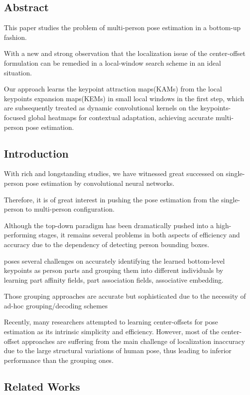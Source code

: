 \documentclass[11pt]{article}
\begin{document}
\subsection{Abstract}
This paper studies the problem of multi-person pose estimation in a bottom-up fashion.

With a new and strong observation that the localization issue of the center-offset formulation can be remedied in a local-window search scheme in an ideal situation.

Our approach learns the keypoint attraction maps(KAMs) from the local keypoints expansion maps(KEMs) in small local windows in the first step, which are subsequently treated as dynamic convolutional kernels on the keypoints-focused global heatmaps for contextual adaptation, achieving accurate multi-person pose estimation.

\subsection{Introduction}
With rich and longstanding studies, we have witnessed great successed on single-person pose estimation by convolutional neural networks.

Therefore, it is of great interest in pushing the pose estimation from the single-person to multi-person configuration.

Although the top-down paradigm has been dramatically pushed into a high-performing stages, it remains several problems in both aspects of efficiency and accuracy due to the dependency of detecting person bounding boxes.

poses several challenges on accurately identifying the learned bottom-level keypoints as person parts and grouping them into different individuals by learning part affinity fields, part association fields, associative embedding.

Those grouping approaches are accurate but sophisticated due to the necessity of ad-hoc
grouping/decoding schemes

Recently, many researchers attempted to learning center-offsets for pose estimation as its intrinsic simplicity and efficiency. However, most of the center-offset approaches are suffering from the main challenge of localization inaccuracy due to the large structural variations of human pose, thus leading to inferior performance than the grouping ones.
\subsection{Related Works}
\end{document}
